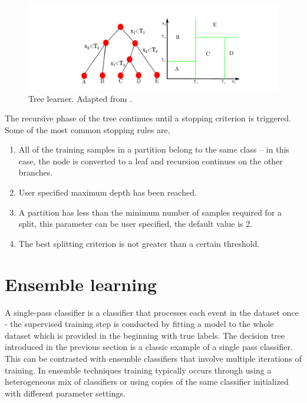 \begin{figure}
\hspace{-10mm}
\includegraphics[scale=0.4]{images/tree_learner.png}
\caption{Tree learner. Adapted from \cite{treelearner}.}
\label{flow_tree}
\end{figure}

The recursive phase of the tree continues until a stopping criterion is triggered. Some of the most common stopping rules are, 

\begin{enumerate}
\item{All of the training samples in a partition belong to the same class -- in this case, the node is converted to a leaf and recursion continues on the other branches.}
\item{User specified maximum depth has been reached.}
\item{A partition has less than the minimum number of samples required for a split, this parameter can be user specified, the default value is 2.}
\item{The best splitting criterion is not greater than a certain threshold.}
\end{enumerate} 

\section{Ensemble learning} 
\label{ensemble}

A single-pass classifier is a classifier that processes each event in the dataset once - the supervised training step is conducted by fitting a model to the whole dataset which is provided in the beginning with true labels. The decision tree introduced in the previous section is a classic example of a single pass classifier. This can be contrasted with ensemble classifiers that involve multiple iterations of training. In ensemble techniques training typically occurs through using a heterogeneous mix of classifiers or using copies of the same classifier initialized with different parameter settings. 

